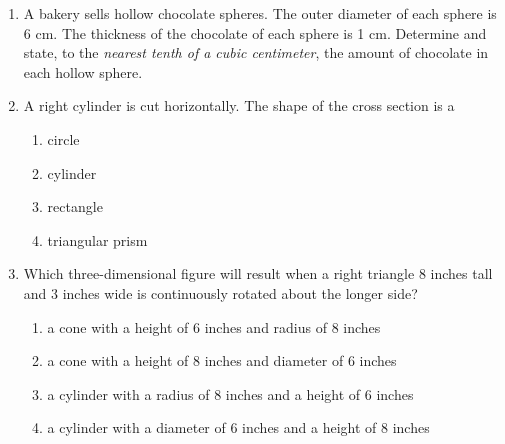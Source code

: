 \documentclass[12pt, twoside]{article}
\begin{document}
\begin{enumerate}
  \item A bakery sells hollow chocolate spheres. The outer diameter of each sphere is 6 cm. The thickness of the chocolate of each sphere is 1 cm. Determine and state, to the \emph{nearest tenth of a cubic centimeter}, the amount of chocolate in each hollow sphere.\\[0.5cm]
   \vspace{1.25cm}

  \item A right cylinder is cut horizontally. The shape of the cross section is a
    \begin{enumerate}
      \item circle
      \item cylinder
      \item rectangle
      \item triangular prism
    \end{enumerate}

  \item Which three-dimensional figure will result when a right triangle 8 inches tall and 3 inches wide is continuously rotated about the longer side?
    \begin{enumerate}
      \item a cone with a height of 6 inches and radius of 8 inches
      \item a cone with a height of 8 inches and diameter of 6 inches
      \item a cylinder with a radius of 8 inches and a height of 6 inches
      \item a cylinder with a diameter of 6 inches and a height of 8 inches
    \end{enumerate}

\newpage


\end{enumerate}
\end{document}
